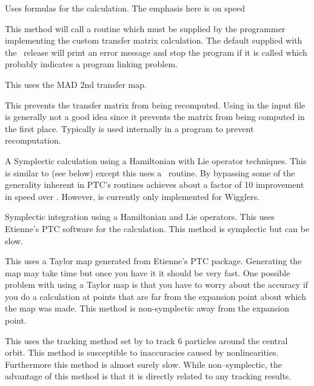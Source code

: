 \begin{description}

\item[\vn{Bmad\_Standard}]
Uses formulas for the calculation. The emphasis here is on speed

\item[\vn{Custom}]
This method will call a routine  which must be
supplied by the programmer implementing the custom transfer matrix
calculation. The default  supplied with the
\bmad\ release will print an error message and stop the program if it
is called which probably indicates a program linking problem.

\item[\vn{MAD}]
This uses the MAD 2nd transfer map.

\item[\vn{None}]
This prevents the transfer matrix from being recomputed.
Using  in the input file is generally not a good idea since
it prevents the matrix from being computed in the first place.
Typically  is used internally in a program to prevent recomputation.

\item[\vn{Symp\_Lie\_Bmad}]
A Symplectic calculation using a Hamiltonian with Lie operator techniques.
This is similar to  (see below) except this uses a
\bmad\ routine. By bypassing some of the generality inherent in PTC's routines
 achieves about a factor of 10 improvement in speed over
. However,  is
currently only implemented for Wigglers.

\item[\vn{Symp\_Lie\_PTC}]
Symplectic integration using a Hamiltonian and Lie operators.
This uses Etienne's PTC software for the calculation.
This method is symplectic but can be slow.

\item[\vn{Taylor}]
This uses a Taylor map generated from Etienne's PTC
package. Generating the map may take time but once you have it it
should be very fast. One possible problem with using a Taylor map is
that you have to worry about the accuracy if you do a calculation at points
that are far from the expansion point about which the map was
made. This method is non-symplectic away from the expansion point. 

\item[\vn{Tracking}]
This uses the tracking method set by  to track 6
particles around the central orbit. This method is susceptible to inaccuracies
caused by nonlinearities. Furthermore this method
is almost surely slow. While non--symplectic, the advantage of this method
is that it is directly related to any tracking results.

\end{description}

